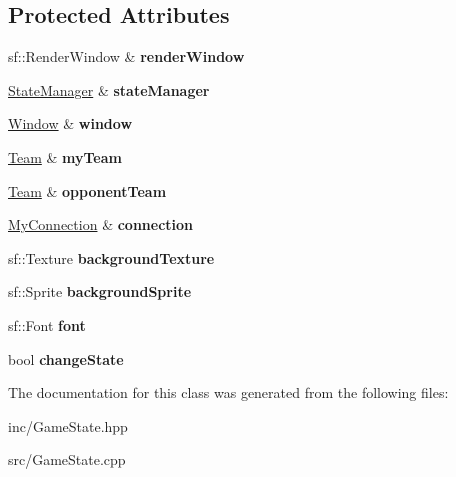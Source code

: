 \subsection*{Protected Attributes}
\begin{DoxyCompactItemize}
\item 
\hypertarget{class_game_state_aac9e2d8992707b230b5642c3a71d1ec7}{sf\+::\+Render\+Window \& {\bfseries render\+Window}}\label{class_game_state_aac9e2d8992707b230b5642c3a71d1ec7}

\item 
\hypertarget{class_game_state_a788e36de3468e28516f5e67b5e4f0cd3}{\hyperlink{class_state_manager}{State\+Manager} \& {\bfseries state\+Manager}}\label{class_game_state_a788e36de3468e28516f5e67b5e4f0cd3}

\item 
\hypertarget{class_game_state_a52dd998b1e092c098c423b77fb567ca0}{\hyperlink{class_window}{Window} \& {\bfseries window}}\label{class_game_state_a52dd998b1e092c098c423b77fb567ca0}

\item 
\hypertarget{class_game_state_a70bafec6e65c4661a982fabf04c539d1}{\hyperlink{class_team}{Team} \& {\bfseries my\+Team}}\label{class_game_state_a70bafec6e65c4661a982fabf04c539d1}

\item 
\hypertarget{class_game_state_af7b49b94a1ad7a7e4ce13790e17315f4}{\hyperlink{class_team}{Team} \& {\bfseries opponent\+Team}}\label{class_game_state_af7b49b94a1ad7a7e4ce13790e17315f4}

\item 
\hypertarget{class_game_state_ae3842953b76bf3eadfc75b1e541ba2c1}{\hyperlink{class_my_connection}{My\+Connection} \& {\bfseries connection}}\label{class_game_state_ae3842953b76bf3eadfc75b1e541ba2c1}

\item 
\hypertarget{class_game_state_a1ed971ac4b35afb31bf8ddf6475d0998}{sf\+::\+Texture {\bfseries background\+Texture}}\label{class_game_state_a1ed971ac4b35afb31bf8ddf6475d0998}

\item 
\hypertarget{class_game_state_a12c59eab3fa5132bb2186ff9976402ee}{sf\+::\+Sprite {\bfseries background\+Sprite}}\label{class_game_state_a12c59eab3fa5132bb2186ff9976402ee}

\item 
\hypertarget{class_game_state_ab60dc490bb2d288a20712d1455aa70e8}{sf\+::\+Font {\bfseries font}}\label{class_game_state_ab60dc490bb2d288a20712d1455aa70e8}

\item 
\hypertarget{class_game_state_a01a28657545bec0d554e66bb2cf42a57}{bool {\bfseries change\+State}}\label{class_game_state_a01a28657545bec0d554e66bb2cf42a57}

\end{DoxyCompactItemize}


The documentation for this class was generated from the following files\+:\begin{DoxyCompactItemize}
\item 
inc/Game\+State.\+hpp\item 
src/Game\+State.\+cpp\end{DoxyCompactItemize}
